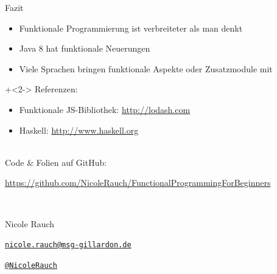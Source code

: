 \begin{frame}[fragile]{Fazit}
\begin{itemize}
\item Funktionale Programmierung ist verbreiteter als man denkt
\item Java 8 hat funktionale Neuerungen
\item Viele Sprachen bringen funktionale Aspekte oder Zusatzmodule mit
\end{itemize}

\vfill

\onslide+<2->
Referenzen:

\begin{itemize}
\item Funktionale JS-Bibliothek: \url{http://lodash.com}
\item Haskell: \url{http://www.haskell.org}
\end{itemize}

\end{frame}




{
\begin{frame}{}

        ~\\[4em]
        Code \& Folien auf GitHub:
        \begin{center}
                \url{https://github.com/NicoleRauch/FunctionalProgrammingForBeginners}
        \end{center}

        ~\\[1em]
        \begin{block}{Nicole Rauch}
        \begin{description}[Twitterxx]
                \item[E-Mail]  \href{mailto:nicole.rauch@msg-gillardon.de}{\texttt{nicole.rauch@msg-gillardon.de}}
                \item[Twitter] \href{http://twitter.com/NicoleRauch}{\texttt{@NicoleRauch}}
        \end{description}
        \end{block}
\end{frame}
}
